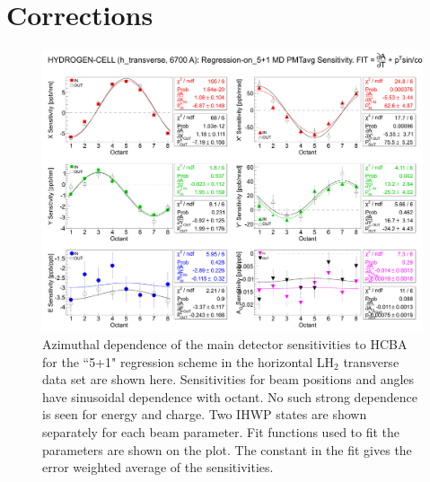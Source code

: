 \section{Corrections}
\label{Corrections}

\begin{figure}[!h]
	\begin{center}
	\includegraphics[width=15.0cm]{figures/MD_h_transverse_5+1_Sensitivities}
	\end{center}
	\caption
	{Azimuthal dependence of the main detector sensitivities to HCBA for the ``5+1" regression scheme in the horizontal LH$_{2}$ transverse data set are shown here. Sensitivities for beam positions and angles have sinusoidal dependence with octant. No such strong dependence is seen for energy and charge. Two IHWP states are shown separately for each beam parameter. Fit functions used to fit the parameters are shown on the plot. The constant in the fit gives the error weighted average of the sensitivities.}
	\label{fig:MD_h_transverse_5+1_Sensitivities}
\end{figure}

